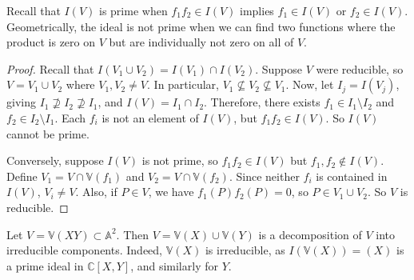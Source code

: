 Recall that \( I(V) \) is prime when \( f_1 f_2 \in I(V) \) implies \( f_1 \in I(V) \) or \( f_2 \in I(V) \).
Geometrically, the ideal is not prime when we can find two functions where the product is zero on \( V \) but are individually not zero on all of \( V \).
\begin{proof}
    Recall that \( I(V_1 \cup V_2) = I(V_1) \cap I(V_2) \).
    Suppose \( V \) were reducible, so \( V = V_1 \cup V_2 \) where \( V_1, V_2 \neq V \).
    In particular, \( V_1 \not\subseteq V_2 \not\subseteq V_1 \).
    Now, let \( I_j = I(V_j) \), giving \( I_1 \not\supseteq I_2 \not\supseteq I_1 \), and \( I(V) = I_1 \cap I_2 \).
    Therefore, there exists \( f_1 \in I_1 \setminus I_2 \) and \( f_2 \in I_2 \setminus I_1 \).
    Each \( f_i \) is not an element of \( I(V) \), but \( f_1 f_2 \in I(V) \).
    So \( I(V) \) cannot be prime.

    Conversely, suppose \( I(V) \) is not prime, so \( f_1 f_2 \in I(V) \) but \( f_1, f_2 \not\in I(V) \).
    Define \( V_1 = V \cap \mathbb V(f_1) \) and \( V_2 = V \cap \mathbb V(f_2) \).
    Since neither \( f_i \) is contained in \( I(V) \), \( V_i \neq V \).
    Also, if \( P \in V \), we have \( f_1(P) f_2(P) = 0 \), so \( P \in V_1 \cup V_2 \).
    So \( V \) is reducible.
\end{proof}
\begin{example}
    Let \( V = \mathbb V(XY) \subset \mathbb A^2 \).
    Then \( V = \mathbb V(X) \cup \mathbb V(Y) \) is a decomposition of \( V \) into irreducible components.
    Indeed, \( \mathbb V(X) \) is irreducible, as \( I(\mathbb V(X)) = (X) \) is a prime ideal in \( \mathbb C[X, Y] \), and similarly for \( Y \).
\end{example}

